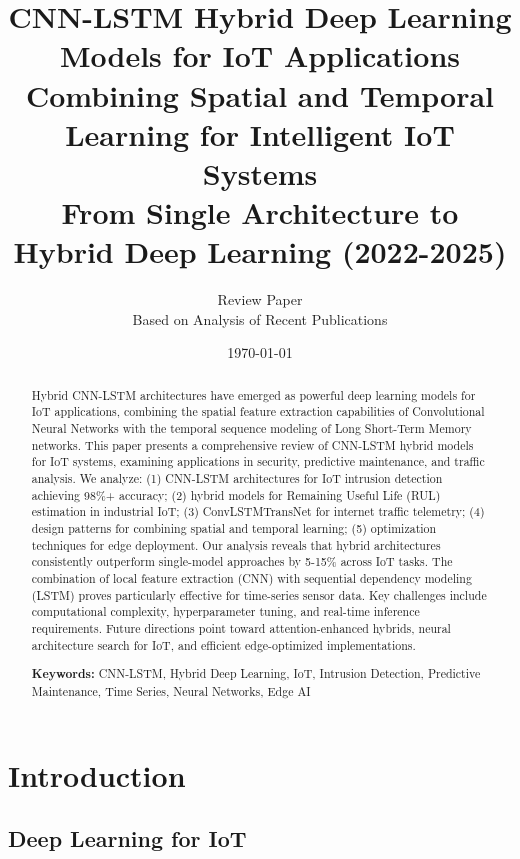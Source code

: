 \documentclass[12pt,a4paper]{article}
\title{
\vspace{-1cm}
{\Huge\bfseries CNN-LSTM Hybrid Deep Learning Models for IoT Applications}\\[0.5cm]
{\Large Combining Spatial and Temporal Learning for Intelligent IoT Systems}\\[0.3cm]
{\large From Single Architecture to Hybrid Deep Learning (2022-2025)}
}
\author{
\large Review Paper\\[0.2cm]
\normalsize Based on Analysis of Recent Publications
}
\date{\today}
\begin{document}
\maketitle
\thispagestyle{empty}

\begin{abstract}
\noindent
Hybrid CNN-LSTM architectures have emerged as powerful deep learning models for IoT applications, combining the spatial feature extraction capabilities of Convolutional Neural Networks with the temporal sequence modeling of Long Short-Term Memory networks. This paper presents a comprehensive review of CNN-LSTM hybrid models for IoT systems, examining applications in security, predictive maintenance, and traffic analysis. We analyze: (1) CNN-LSTM architectures for IoT intrusion detection achieving 98\%+ accuracy; (2) hybrid models for Remaining Useful Life (RUL) estimation in industrial IoT; (3) ConvLSTMTransNet for internet traffic telemetry; (4) design patterns for combining spatial and temporal learning; (5) optimization techniques for edge deployment. Our analysis reveals that hybrid architectures consistently outperform single-model approaches by 5-15\% across IoT tasks. The combination of local feature extraction (CNN) with sequential dependency modeling (LSTM) proves particularly effective for time-series sensor data. Key challenges include computational complexity, hyperparameter tuning, and real-time inference requirements. Future directions point toward attention-enhanced hybrids, neural architecture search for IoT, and efficient edge-optimized implementations.

\vspace{0.3cm}
\noindent\textbf{Keywords:} CNN-LSTM, Hybrid Deep Learning, IoT, Intrusion Detection, Predictive Maintenance, Time Series, Neural Networks, Edge AI
\end{abstract}

\newpage
\tableofcontents
\newpage

\section{Introduction}

\subsection{Deep Learning for IoT}
\end{document}
